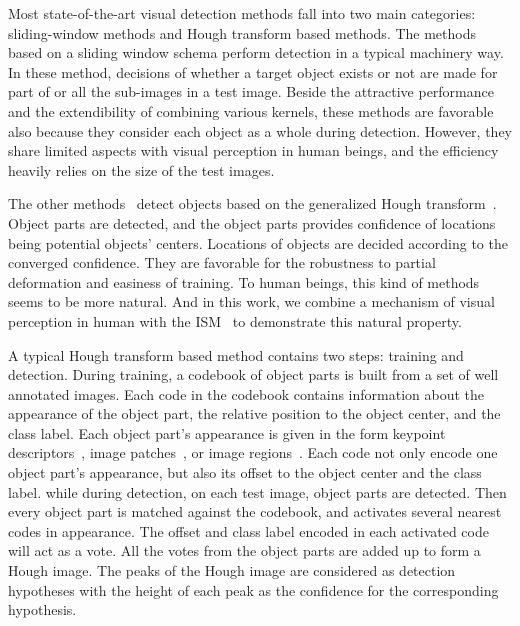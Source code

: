 Most state-of-the-art visual
 detection methods fall into two main categories: sliding-window methods and Hough transform based methods. The methods~\cite{ac4,ac1} based on a sliding window schema perform detection in a typical machinery way. In these method, decisions of whether a target object exists or not are made for part of or all the sub-images in a test image. Beside the attractive performance and the extendibility of combining various kernels, these methods are favorable also because they consider each object as a whole during detection. However, they share limited aspects with visual perception in human beings, and the efficiency heavily relies on the size of the test images.

The other methods~\cite{lb1,ac2,ac3,ac18} detect objects based on the generalized Hough transform~\cite{ac17}. Object parts are detected, and the object parts provides confidence of locations being potential objects' centers. Locations of objects are decided according to the converged confidence. They are favorable for the robustness to partial deformation and easiness of training. To human beings, this kind of methods seems to be more natural. And in this work, we combine a mechanism of visual perception in human with the ISM~\cite{lb1} to demonstrate this natural property.





A typical Hough transform based method contains two steps: training and detection. During training, a codebook of object parts is built from a set of well annotated images. Each code in the codebook contains information about the appearance of the object part, the relative position to the object center, and the class label. Each object part's appearance is given in the form keypoint descriptors~\cite{lb1}, image patches~\cite{ac6,ac7}, or image regions~\cite{ac8}. Each code not only encode one object part's appearance, but also its offset to the  object center and the class label. while during detection, on each test image, object parts are detected. Then every object part is matched against the codebook, and activates several nearest codes in appearance. The offset and class label encoded in each activated code will act as a vote. All the votes from the object parts are added up to form a Hough image. The peaks of the Hough image are considered as detection hypotheses with the height of each peak as the confidence for the corresponding hypothesis.

